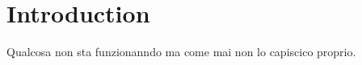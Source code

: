 
    \section{Introduction}
    Qualcosa non sta funzionanndo ma come mai non lo capiscico proprio.
